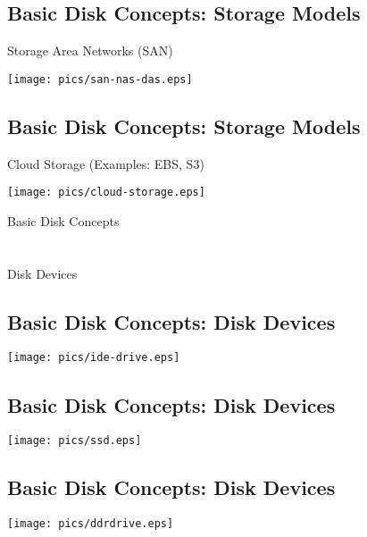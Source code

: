 \documentclass[xga]{xdvislides}
\begin{document}
\subsection{Basic Disk Concepts: Storage Models}
Storage Area Networks (SAN)
\vfill
\begin{center}
	\texttt{[image: pics/san-nas-das.eps]} \\
\end{center}
\vfill

\subsection{Basic Disk Concepts: Storage Models}
Cloud Storage (Examples: EBS, S3)
\vfill
\begin{center}
	\texttt{[image: pics/cloud-storage.eps]} \\
\end{center}
\vfill

\newpage
\vspace*{\fill}
\begin{center}
	\Hugesize
		Basic Disk Concepts \\ [1em]
	\hspace*{5mm}
	\blueline\\
	\hspace*{5mm}\\
		Disk Devices
\end{center}
\vspace*{\fill}


\subsection{Basic Disk Concepts: Disk Devices}
	\begin{center}
		\texttt{[image: pics/ide-drive.eps]} \\
	\end{center}

\subsection{Basic Disk Concepts: Disk Devices}
	\begin{center}
		\texttt{[image: pics/ssd.eps]} \\
	\end{center}

\subsection{Basic Disk Concepts: Disk Devices}
	\begin{center}
		\texttt{[image: pics/ddrdrive.eps]} \\
	\end{center}
\end{document}
